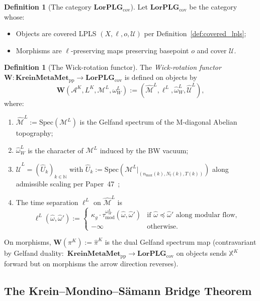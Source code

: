 \documentclass[11pt,a4paper]{article}
\theoremstyle{plain}
\theoremstyle{definition}
\newtheorem{definition}[theorem]{Definition}
\newcommand{\nmax}{n_{\max}}
\newcommand{\Nt}{N_{t}}
\newcommand{\Acal}{\mathcal{A}}
\newcommand{\Mcal}{\mathcal{M}}
\newcommand{\Ucal}{\mathcal{U}}
\newcommand{\N}{\mathbb{N}}
\newcommand{\Wfun}{\mathbf{W}}
\newcommand{\KreinMM}{\mathbf{KreinMetaMet}_{\mathrm{pp}}}
\newcommand{\LorPLG}{\mathbf{LorPLG}_{\mathrm{cov}}}
\newcommand{\BWvac}{\omega_{W}^{L}}
\newcommand{\tmod}{\tau_{\mathrm{mod}}}
\newcommand{\kappag}{\kappa_{g}}
\begin{document}
\begin{definition}[The category $\LorPLG$]\label{def:cat_lorplg}
Let $\LorPLG$ be the category whose:
\begin{itemize}
\item Objects are covered LPLS $(X, \ell, o, \Ucal)$ per
Definition~\ref{def:covered_lpls};
\item Morphisms are $\ell$-preserving maps preserving basepoint $o$
and cover $\Ucal$.
\end{itemize}
\end{definition}

\begin{definition}[The Wick-rotation functor]\label{def:wick_functor}
The \emph{Wick-rotation functor}
$\Wfun : \KreinMM \to \LorPLG$ is defined on objects by
\[
\Wfun(\Acal^{K}, L^{K}, \Mcal^{L}, \BWvac)
:= (\hat{\Mcal}^{L}, \ell^{L}, \hat{\omega}_{W}^{L}, \hat{\Ucal}^{L}),
\]
where:
\begin{enumerate}
\item $\hat{\Mcal}^{L} := \mathrm{Spec}(\Mcal^{L})$ is the Gelfand
spectrum of the M-diagonal Abelian topography;
\item $\hat{\omega}_{W}^{L}$ is the character of $\Mcal^{L}$ induced
by the BW vacuum;
\item $\hat{\Ucal}^{L} = (\hat{U}_{k})_{k \in \N}$ with
$\hat{U}_{k} := \mathrm{Spec}(\Mcal^{L}|_{(\nmax(k), \Nt(k), T(k))})$
along admissible scaling per Paper~47~\cite{paper47};
\item The time separation $\ell^{L}$ on $\hat{\Mcal}^{L}$ is
\[
\ell^{L}(\hat{\omega}, \hat{\omega}') := \begin{cases}
\kappag \cdot \tmod^{\BWvac}(\hat{\omega}, \hat{\omega}') &
\text{if } \hat{\omega} \preceq \hat{\omega}' \text{ along modular flow,} \\
-\infty & \text{otherwise.}
\end{cases}
\]
\end{enumerate}
On morphisms, $\Wfun(\pi^{K}) := \hat{\pi}^{K}$ is the dual Gelfand
spectrum map (contravariant by Gelfand duality:\
$\KreinMM \to \LorPLG$ on objects sends $\mathbb{X}^{K}$ forward but
on morphisms the arrow direction reverses).
\end{definition}

\subsection{The Krein--Mondino--S\"amann Bridge
Theorem}\label{sec:bridge_theorem}
\end{document}
